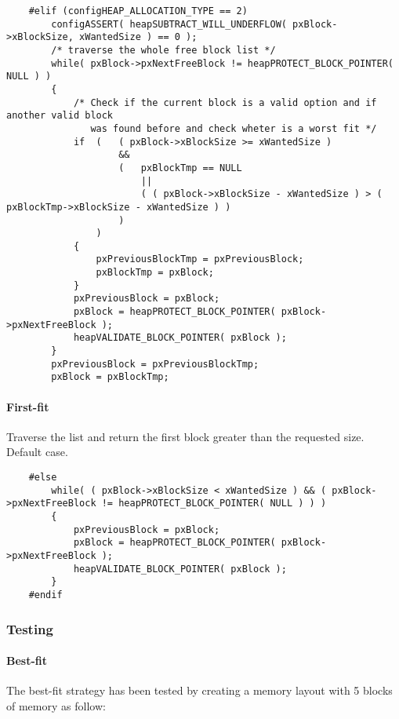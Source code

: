    \begin{codebox}
    \begin{lstlisting}
    #elif (configHEAP_ALLOCATION_TYPE == 2)
        configASSERT( heapSUBTRACT_WILL_UNDERFLOW( pxBlock->xBlockSize, xWantedSize ) == 0 );
        /* traverse the whole free block list */
        while( pxBlock->pxNextFreeBlock != heapPROTECT_BLOCK_POINTER( NULL ) )
        {
            /* Check if the current block is a valid option and if another valid block
               was found before and check wheter is a worst fit */
            if  (   ( pxBlock->xBlockSize >= xWantedSize )
                    &&
                    (   pxBlockTmp == NULL
                        ||
                        ( ( pxBlock->xBlockSize - xWantedSize ) > ( pxBlockTmp->xBlockSize - xWantedSize ) )
                    )
                )
            {
                pxPreviousBlockTmp = pxPreviousBlock;
                pxBlockTmp = pxBlock;
            }
            pxPreviousBlock = pxBlock;
            pxBlock = heapPROTECT_BLOCK_POINTER( pxBlock->pxNextFreeBlock );
            heapVALIDATE_BLOCK_POINTER( pxBlock );
        }
        pxPreviousBlock = pxPreviousBlockTmp;
        pxBlock = pxBlockTmp;
    \end{lstlisting}
    \end{codebox}

    \paragraph{First-fit} Traverse the list and return the first block greater than the requested size. Default case.

    \begin{codebox}
    \begin{lstlisting}
    #else
        while( ( pxBlock->xBlockSize < xWantedSize ) && ( pxBlock->pxNextFreeBlock != heapPROTECT_BLOCK_POINTER( NULL ) ) )
        {
            pxPreviousBlock = pxBlock;
            pxBlock = heapPROTECT_BLOCK_POINTER( pxBlock->pxNextFreeBlock );
            heapVALIDATE_BLOCK_POINTER( pxBlock );
        }
    #endif
    \end{lstlisting}
    \end{codebox}

    \subsubsection{Testing}
    \paragraph{Best-fit} The best-fit strategy has been tested by creating a memory layout with 5 blocks of memory as follow:

